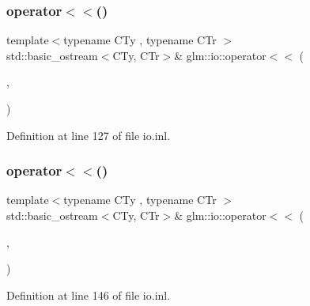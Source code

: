 \mbox{\label{namespaceglm_1_1io_a61e151e99a1d05cb604f0bede66996be}} 
\subsubsection{\texorpdfstring{operator$<$$<$()}{operator<<()}\hspace{0.1cm}{\footnotesize\ttfamily [7/8]}}
{\footnotesize\ttfamily template$<$typename C\+Ty , typename C\+Tr $>$ \\
std\+::basic\+\_\+ostream$<$C\+Ty, C\+Tr$>$\& glm\+::io\+::operator$<$$<$ (\begin{DoxyParamCaption}\item[{std\+::basic\+\_\+ostream$<$ C\+Ty, C\+Tr $>$ \&}]{,  }\item[{\mbox{\hyperlink{structglm_1_1io_1_1width}{width}} const \&}]{ }\end{DoxyParamCaption})}



Definition at line 127 of file io.\+inl.

\mbox{\label{namespaceglm_1_1io_a72020640c68a8c4e010b7d3f02a0ca92}} 
\subsubsection{\texorpdfstring{operator$<$$<$()}{operator<<()}\hspace{0.1cm}{\footnotesize\ttfamily [8/8]}}
{\footnotesize\ttfamily template$<$typename C\+Ty , typename C\+Tr $>$ \\
std\+::basic\+\_\+ostream$<$C\+Ty, C\+Tr$>$\& glm\+::io\+::operator$<$$<$ (\begin{DoxyParamCaption}\item[{std\+::basic\+\_\+ostream$<$ C\+Ty, C\+Tr $>$ \&}]{,  }\item[{\mbox{\hyperlink{structglm_1_1io_1_1order}{order}} const \&}]{ }\end{DoxyParamCaption})}



Definition at line 146 of file io.\+inl.

\mbox{\label{namespaceglm_1_1io_a8f950faa7ad67cac1287beaf896a8bb6}} 
